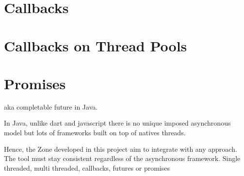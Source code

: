 \section{Callbacks}

\section{Callbacks on Thread Pools}

\section{Promises}
aka completable future in Java.


In Java, unlike dart and javascript there is no unique imposed asynchronous model but lots of frameworks built on top of natives threads.

Hence, the Zone developed in this project aim to integrate with any approach. The tool must stay consistent regardless of the asynchronous framework. Single threaded, multi threaded, callbacks, futures or promises